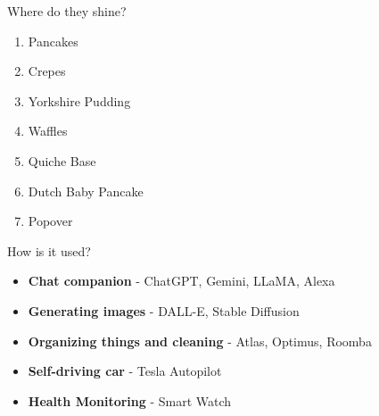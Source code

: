 \documentclass[final]{beamer}
\newlength{\colwidth}
\begin{document}
\begin{frame}{}
\begin{columns}[t]
\begin{column}{\colwidth}
\begin{myblock}{Where do they shine?}
\begin{minipage}[t]{0.49\textwidth}
\begin{tcolorbox}[colback=blockcolor]
        \begin{enumerate}
            \item Pancakes
            \item Crepes
            \item Yorkshire Pudding
            \item Waffles
            \item Quiche Base
            \item Dutch Baby Pancake
            \item Popover
        \end{enumerate}
        \end{tcolorbox}
    \end{minipage}
    
 
    \end{myblock}

    \begin{myblock}{How is it used?}
    \begin{itemize}
        \item \textbf{Chat companion} - ChatGPT, Gemini, LLaMA, Alexa
        \item \textbf{Generating images} - DALL-E, Stable Diffusion
        \item \textbf{Organizing things and cleaning} - Atlas, Optimus, Roomba
        \item \textbf{Self-driving car} - Tesla Autopilot
        \item \textbf{Health Monitoring} - Smart Watch
    \end{itemize}
    
    \end{myblock}
    
\end{column}


\end{columns}
\end{frame}
\end{document}
